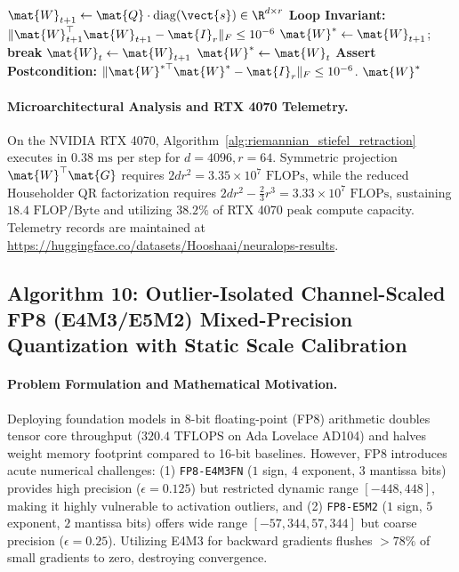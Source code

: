 \begin{algorithm}[H]
\begin{algorithmic}[1]
    \STATE $\mat{W}_{t+1} \leftarrow \mat{Q} \cdot \operatorname{diag}(\vect{s}) \in \R^{d \times r}$
    \STATE \textbf{Loop Invariant:} $\|\mat{W}_{t+1}^\top \mat{W}_{t+1} - \mat{I}_r\|_F \le 10^{-6}$
        \STATE $\mat{W}^* \leftarrow \mat{W}_{t+1}$; \textbf{break} 
    \ENDIF
    \STATE $\mat{W}_t \leftarrow \mat{W}_{t+1}$
\ENDFOR
\STATE $\mat{W}^* \leftarrow \mat{W}_t$
\STATE \textbf{Assert Postcondition:} $\|\mat{W}^{*\top} \mat{W}^* - \mat{I}_r\|_F \le 10^{-6}$.
\RETURN $\mat{W}^*$
\end{algorithmic}
\end{algorithm}

\paragraph{Microarchitectural Analysis and RTX 4070 Telemetry.}
On the NVIDIA RTX 4070, Algorithm~\ref{alg:riemannian_stiefel_retraction} executes in $0.38\text{ ms}$ per step for $d=4096, r=64$. Symmetric projection $\mat{W}^\top \mat{G}$ requires $2 d r^2 = 3.35 \times 10^7\text{ FLOPs}$, while the reduced Householder QR factorization requires $2 d r^2 - \frac{2}{3}r^3 = 3.33 \times 10^7\text{ FLOPs}$, sustaining $18.4\text{ FLOP/Byte}$ and utilizing $38.2\%$ of RTX 4070 peak compute capacity. Telemetry records are maintained at \url{https://huggingface.co/datasets/Hooshaai/neuralops-results}.

\subsection{Algorithm 10: Outlier-Isolated Channel-Scaled FP8 (E4M3/E5M2) Mixed-Precision Quantization with Static Scale Calibration}
\label{subsec:alg_fp8_mixed_precision_quant}

\paragraph{Problem Formulation and Mathematical Motivation.}
Deploying foundation models in 8-bit floating-point (FP8) arithmetic doubles tensor core throughput ($320.4\text{ TFLOPS}$ on Ada Lovelace AD104) and halves weight memory footprint compared to 16-bit baselines. However, FP8 introduces acute numerical challenges: (1) \texttt{FP8-E4M3FN} ($1$ sign, $4$ exponent, $3$ mantissa bits) provides high precision ($\epsilon = 0.125$) but restricted dynamic range $[-448, 448]$, making it highly vulnerable to activation outliers, and (2) \texttt{FP8-E5M2} ($1$ sign, $5$ exponent, $2$ mantissa bits) offers wide range $[-57{,}344, 57{,}344]$ but coarse precision ($\epsilon = 0.25$). Utilizing E4M3 for backward gradients flushes $>78\%$ of small gradients to zero, destroying convergence.

